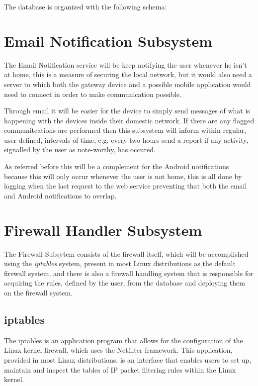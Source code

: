 

The database is organized with the following schema:



\section{Email Notification Subsystem}
\label{chap4:sec:email-sys}
The Email Notification service will be keep notifying the user whenever he isn't
at home, this is a measure of securing the local network, but it would also need
a server to which both the gateway device and a possible mobile application
would need to connect in order to make communication possible.

Through email it will be easier for the device to simply send messages of what
is happening with the devices inside their domestic network. If there are any
flagged communitcations are performed then this subsystem will inform within
regular, user defined, intervals of time, e.g. every two hours send a report if
any activity, signalled by the user as note-worthy, has occured.

As referred before this will be a complement for the Android notifications
because this will only occur whenever the user is not home, this is all done by
logging when the last request to the web service preventing that both the email
and Android notifications to overlap.

\section{Firewall Handler Subsystem}
\label{chap4:sec:firewall-sys}
The Firewall Subsytem consists of the firewall itself, which will be
accomplished using the \emph{iptables} system, present in most Linux
distributions as the default firewall system, and there is also a firewall
handling system that is responsible for acquiring the rules, defined by the
user, from the database and deploying them on the firewall system.

\subsection{iptables}
\label{chap4:sec:firewall-sys:sub:iptables}
The iptables is an application program that allows for the configuration of the
Linux kernel firewall, which uses the Netfilter framework. This application,
provided in most Linux distributions, is an interface that enables users to
set up, maintain and inspect the tables of IP packet filtering rules within the
Linux kernel.

